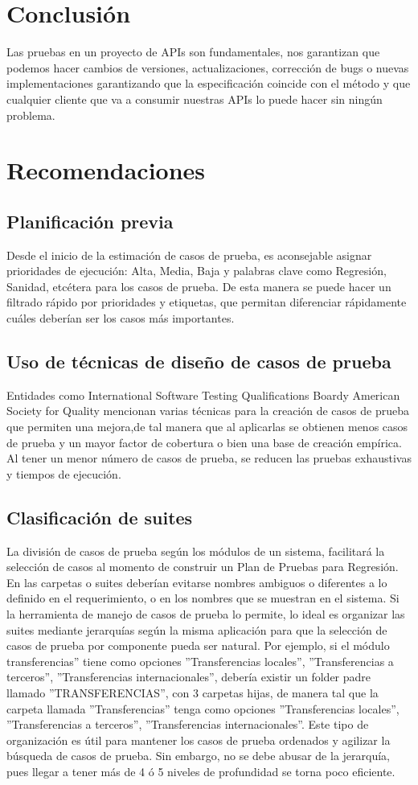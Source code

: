 \documentclass{article}
\begin{document}
\begin{multicols}{2}
\section{Conclusión}
Las pruebas en un proyecto de APIs son fundamentales, nos garantizan que podemos hacer cambios de versiones, actualizaciones, corrección de bugs o nuevas implementaciones garantizando que la especificación coincide con el método y que
cualquier cliente que va a consumir nuestras APIs lo puede hacer sin ningún problema.

\section{Recomendaciones}
\subsection{Planificación previa}
Desde el inicio de la estimación de casos de
prueba, es aconsejable asignar prioridades de ejecución: Alta, Media, Baja y palabras clave como
Regresión, Sanidad, etcétera para los casos de
prueba. De esta manera se puede hacer un filtrado
rápido por prioridades y etiquetas, que permitan
diferenciar rápidamente cuáles deberían ser los
casos más importantes.
\subsection{Uso de técnicas de diseño de casos de prueba}
Entidades como International Software Testing
Qualifications Boardy American Society for Quality
mencionan varias técnicas para la creación de casos
de prueba que permiten una mejora,de tal manera
que al aplicarlas se obtienen menos casos de
prueba y un mayor factor de cobertura o bien una
base de creación empírica.
Al tener un menor número de casos de prueba,
se reducen las pruebas exhaustivas y tiempos de
ejecución.
\subsection{Clasificación de suites}
La división de casos de prueba según los módulos
de un sistema, facilitará la selección de casos al momento
de construir un Plan de Pruebas para Regresión.
En las carpetas o suites deberían evitarse nombres
ambiguos o diferentes a lo definido en el requerimiento,
o en los nombres que se muestran en
el sistema.
Si la herramienta de manejo de casos de prueba
lo permite, lo ideal es organizar las suites mediante
jerarquías según la misma aplicación para que
la selección de casos de prueba por componente
pueda ser natural. Por ejemplo, si el módulo transferencias”
tiene como opciones ”Transferencias locales”,
”Transferencias a terceros”, ”Transferencias
internacionales”, debería existir un folder padre llamado
”TRANSFERENCIAS”, con 3 carpetas hijas,
de manera tal que la carpeta llamada ”Transferencias”
tenga como opciones ”Transferencias locales”,
”Transferencias a terceros”, ”Transferencias internacionales”.
Este tipo de organización es útil para mantener los
casos de prueba ordenados y agilizar la búsqueda
de casos de prueba. Sin embargo, no se debe
abusar de la jerarquía, pues llegar a tener más de
4 ó 5 niveles de profundidad se torna poco eficiente.

\end{multicols}
\end{document}

